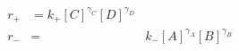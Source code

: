 \begin{eqnarray}
r_+ & =  k_+[C]^{\gamma_C}[D]^{\gamma_D} \\
r_- & = & k_-[A]^{\gamma_A}[B]^{\gamma_B} \\
\end{eqnarray}